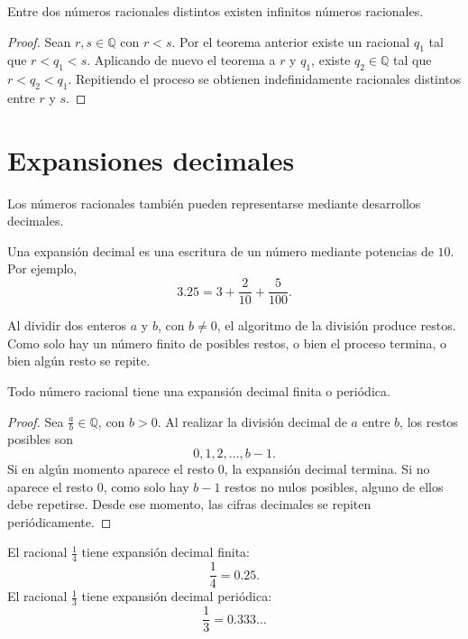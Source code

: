 \begin{corolario}
Entre dos números racionales distintos existen infinitos números racionales.
\end{corolario}

\begin{proof}
Sean \(r,s\in\mathbb{Q}\) con \(r<s\). Por el teorema anterior existe un racional \(q_1\) tal que \(r<q_1<s\). Aplicando de nuevo el teorema a \(r\) y \(q_1\), existe \(q_2\in\mathbb{Q}\) tal que \(r<q_2<q_1\). Repitiendo el proceso se obtienen indefinidamente racionales distintos entre \(r\) y \(s\).
\end{proof}

\section{Expansiones decimales}

Los números racionales también pueden representarse mediante desarrollos decimales.

\begin{definicion}
Una expansión decimal es una escritura de un número mediante potencias de \(10\). Por ejemplo,
\[
  3.25=3+\frac{2}{10}+\frac{5}{100}.
\]
\end{definicion}

Al dividir dos enteros \(a\) y \(b\), con \(b\neq 0\), el algoritmo de la división produce restos. Como solo hay un número finito de posibles restos, o bien el proceso termina, o bien algún resto se repite.

\begin{proposicion}
Todo número racional tiene una expansión decimal finita o periódica.
\end{proposicion}

\begin{proof}
Sea \(\frac{a}{b}\in\mathbb{Q}\), con \(b>0\). Al realizar la división decimal de \(a\) entre \(b\), los restos posibles son
\[
  0,1,2,\ldots,b-1.
\]
Si en algún momento aparece el resto \(0\), la expansión decimal termina. Si no aparece el resto \(0\), como solo hay \(b-1\) restos no nulos posibles, alguno de ellos debe repetirse. Desde ese momento, las cifras decimales se repiten periódicamente.
\end{proof}

\begin{ejemplo}
El racional \(\frac{1}{4}\) tiene expansión decimal finita:
\[
  \frac{1}{4}=0.25.
\]
El racional \(\frac{1}{3}\) tiene expansión decimal periódica:
\[
  \frac{1}{3}=0.333\ldots
\]
\end{ejemplo}

